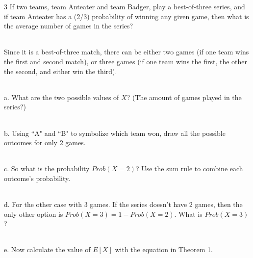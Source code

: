 \documentclass[a4paper,12pt]{book}
\newcounter{question}
\begin{document}
    \newpage
        \begin{question}{\thequestion}{3}
        If two teams, team Anteater and team Badger, play a
        best-of-three series, and if team Anteater has a (2/3)
        probability of winning any given game, then what is the
        average number of games in the series?

        ~\\
        Since it is a best-of-three match, there can be either
        two games (if one team wins the first and second match),
        or three games (if one team wins the first, the other the second, and either win the third).

        ~\\
        a. What are the two possible values of $X$? (The amount of games played in the series?)

        ~\\
        b. Using ``A" and ``B" to symbolize which team won,
        draw all the possible outcomes for only 2 games.

        ~\\
        c. So what is the probability $Prob(X = 2)$? Use the sum rule
        to combine each outcome's probability.

        ~\\
        d. For the other case with 3 games. If the series
        doesn't have 2 games, then the only other option is
        $Prob(X = 3) = 1 - Prob(X=2)$. What is $Prob(X=3)$?

        ~\\
        e. Now calculate the value of $E[X]$ with the equation in Theorem 1.

    \end{question}
\end{document}
